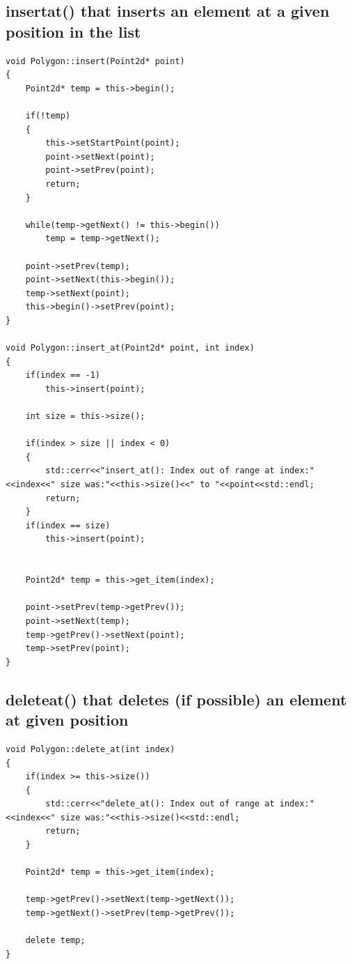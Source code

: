 \documentclass{article}
\begin{document}
		\subsection{insertat() that inserts an element at a given position in the list}
		
\begin{lstlisting}[label=polygon-insert,caption=Polygon::insertat(int)]	
void Polygon::insert(Point2d* point)
{
    Point2d* temp = this->begin();

    if(!temp)
    {
        this->setStartPoint(point);
        point->setNext(point);
        point->setPrev(point);
        return;
    }

    while(temp->getNext() != this->begin())
        temp = temp->getNext();

    point->setPrev(temp);
    point->setNext(this->begin());
    temp->setNext(point);
    this->begin()->setPrev(point);
}

void Polygon::insert_at(Point2d* point, int index)
{
    if(index == -1)
        this->insert(point);

    int size = this->size();

    if(index > size || index < 0)
    {
        std::cerr<<"insert_at(): Index out of range at index:"<<index<<" size was:"<<this->size()<<" to "<<point<<std::endl;
        return;
    }
    if(index == size)
        this->insert(point);


    Point2d* temp = this->get_item(index);

    point->setPrev(temp->getPrev());
    point->setNext(temp);
    temp->getPrev()->setNext(point);
    temp->setPrev(point);
}

\end{lstlisting}

		\subsection{deleteat() that deletes (if possible) an element at given position}
		
\begin{lstlisting}[label=polygon-delete,caption=Polygon::deleteat(int)]	
void Polygon::delete_at(int index)
{
    if(index >= this->size())
    {
        std::cerr<<"delete_at(): Index out of range at index:"<<index<<" size was:"<<this->size()<<std::endl;
        return;
    }

    Point2d* temp = this->get_item(index);

    temp->getPrev()->setNext(temp->getNext());
    temp->getNext()->setPrev(temp->getPrev());

    delete temp;
}

\end{lstlisting}
\end{document}
